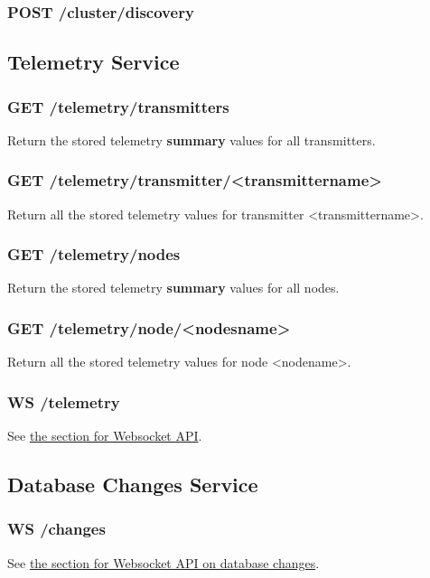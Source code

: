 \subsubsection{POST /cluster/discovery}


\subsection{Telemetry Service}

\subsubsection{GET /telemetry/transmitters}
Return the stored telemetry \textbf{summary} values for all transmitters.

\subsubsection{GET /telemetry/transmitter/<transmittername>}
Return all the stored telemetry values for transmitter <transmittername>.

\subsubsection{GET /telemetry/nodes}
Return the stored telemetry \textbf{summary} values for all nodes.

\subsubsection{GET /telemetry/node/<nodesname>}
Return all the stored telemetry values for node <nodename>.

\subsubsection{WS /telemetry}
See \hyperref[protocoldef:websocketapi]{the section for Websocket API}.


\subsection{Database Changes Service}

\subsubsection{WS /changes}
See \hyperref[protcoldef:websocketapi:databasechanges]{the section for Websocket API on database changes}.

